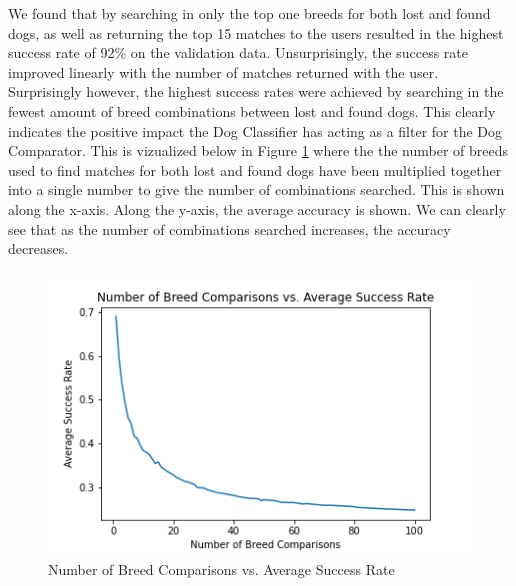 \documentclass{article}
\begin{document}
We found that by searching in only the top one breeds for both lost and found dogs, as well as returning the top 15 matches to the users resulted in the highest success rate of 92\% on the validation data.  Unsurprisingly, the success rate improved linearly with the number of matches returned with the user.  Surprisingly however, the highest success rates were achieved by searching in the fewest amount of breed combinations between lost and found dogs.  This clearly indicates the positive impact the Dog Classifier has acting as a filter for the Dog Comparator.  This is vizualized below in Figure \ref{fig:x breed comparisons} where the the number of breeds used to find matches for both lost and found dogs have been multiplied together into a single number to give the number of combinations searched.  This is shown along the x-axis.  Along the y-axis, the average accuracy is shown.  We can clearly see that as the number of combinations searched increases, the accuracy decreases.

\begin{figure}[]
\centering
	\includegraphics[scale=0.7]{final-report-images/num_breed_comparison_accuracy.png}
\caption{Number of Breed Comparisons vs. Average Success Rate}
\label{fig:x breed comparisons}
\end{figure}
\end{document}
